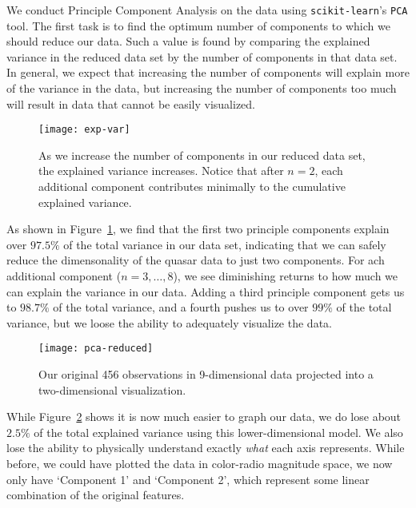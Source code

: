 We conduct Principle Component Analysis on the data using \texttt{scikit-learn}'s \texttt{PCA} tool. The first task is to find the optimum number of components to which we should reduce our data. Such a value is found by comparing the explained variance in the reduced data set by the number of components in that data set. In general, we expect that increasing the number of components will explain more of the variance in the data, but increasing the number of components too much will result in data that cannot be easily visualized.

\begin{figure}
	\texttt{[image: exp-var]}
	\caption{As we increase the number of components in our reduced data set, the explained variance increases. Notice that after $n=2$, each additional component contributes minimally to the cumulative explained variance.}
	\label{fig:exp-var}
\end{figure}

As shown in Figure~\ref{fig:exp-var}, we find that the first two principle components explain over $97.5\%$ of the total variance in our data set, indicating that we can safely reduce the dimensonality of the quasar data to just two components. For ach additional component ($n = 3, \dots, 8$), we see diminishing returns to how much we can explain the variance in our data. Adding a third principle component gets us to $98.7\%$ of the total variance, and a fourth pushes us to over $99\%$ of the total variance, but we loose the ability to adequately visualize the data.

\begin{figure}
	\texttt{[image: pca-reduced]}
	\caption{Our original 456 observations in 9-dimensional data projected into a two-dimensional visualization.}
	\label{fig:pca-red}
\end{figure} 
While Figure~\ref{fig:pca-red} shows it is now much easier to graph our data, we do lose about $2.5\%$ of the total explained variance using this lower-dimensional model. We also lose the ability to physically understand exactly \emph{what} each axis represents. While before, we could have plotted the data in color-radio magnitude space, we now only have `Component 1' and `Component 2', which represent some linear combination of the original features.